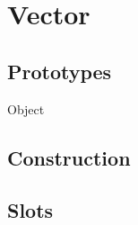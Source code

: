 
\section{Vector}

\subsection{Prototypes}
\begin{refObjects}
\item[Object]
\end{refObjects}

\subsection{Construction}

\subsection{Slots}

